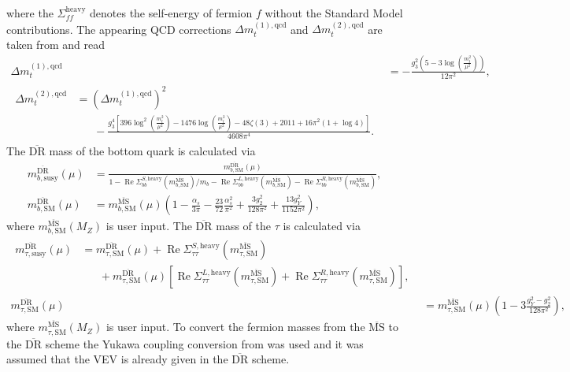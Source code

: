 \documentclass[final,3p,times,pdflatex]{elsarticle}
\newcommand{\textoverline}[1]{$\overline{\mbox{#1}}$}
\newcommand{\DRbar}{\textoverline{DR}\xspace}
\newcommand{\MSbar}{\textoverline{MS}\xspace}
\DeclareMathOperator{\re}{Re}
\begin{document}
%
where the $\Sigma_{ff}^\text{heavy}$ denotes the self-energy of
fermion $f$ without the Standard Model contributions.  The appearing
QCD corrections $\Delta m_t^{(1),\text{qcd}}$ and $\Delta
m_t^{(2),\text{qcd}}$ are taken from
\cite[Eq.\ (58),(61)]{Bednyakov:2002sf} and read
%
\begin{align}
  \Delta m_t^{(1),\text{qcd}} &= -\frac{g_3^2 \left(5-3 \log\left(\frac{m_t^2}{\mu^2}\right)\right)}{12 \pi^2},\\
  \begin{split}
    \Delta m_t^{(2),\text{qcd}} &= \left(\Delta
      m_t^{(1),\text{qcd}}\right)^2 \\
    &\phantom{=\;} - \frac{g_3^4 \left[396
        \log^2\left(\frac{m_t^2}{\mu^2}\right)-1476
        \log\left(\frac{m_t^2}{\mu^2}\right)-48 \zeta(3)+2011+16 \pi
        ^2 (1+\log 4)\right]}{4608 \pi^4}.
  \end{split}
\end{align}
%
The \DRbar mass of the bottom quark is calculated via
\cite{Baer:2002ek,Skands:2003cj}
%
\begin{align}
  m_{b,\text{susy}}^{\text{\DRbar}}(\mu) &=
  \frac{m_{b,\text{SM}}^{\text{\DRbar}}(\mu)}{1 -
    \re\Sigma_{bb}^{S,\text{heavy}}(m_{b,\text{SM}}^\text{\MSbar})/m_b
    - \re\Sigma_{bb}^{L,\text{heavy}}(m_{b,\text{SM}}^\text{\MSbar}) -
    \re\Sigma_{bb}^{R,\text{heavy}}(m_{b,\text{SM}}^\text{\MSbar})} ,\\
  m_{b,\text{SM}}^{\text{\DRbar}}(\mu) &=
  m_{b,\text{SM}}^{\text{\MSbar}}(\mu) \left(1 - \frac{\alpha_s}{3
      \pi} - \frac{23}{72} \frac{\alpha_s^2}{\pi^2} + \frac{3
      g_2^2}{128 \pi^2} + \frac{13 g_Y^2}{1152 \pi^2}\right) ,
\end{align}
%
where $m_{b,\text{SM}}^{\text{\MSbar}}(M_Z)$ is user input.  The
\DRbar mass of the $\tau$ is calculated via
%
\begin{align}
  \begin{split}
    m_{\tau,\text{susy}}^{\text{\DRbar}}(\mu) &=
    m_{\tau,\text{SM}}^{\text{\DRbar}}(\mu) +
    \re\Sigma_{\tau\tau}^{S,\text{heavy}}(m_{\tau,\text{SM}}^\text{\MSbar}) \\
    &\phantom{=\;} + m_{\tau,\text{SM}}^{\text{\DRbar}}(\mu) \left[
      \re\Sigma_{\tau\tau}^{L,\text{heavy}}(m_{\tau,\text{SM}}^\text{\MSbar})
      +
      \re\Sigma_{\tau\tau}^{R,\text{heavy}}(m_{\tau,\text{SM}}^\text{\MSbar})
    \right] ,
  \end{split}\\
  m_{\tau,\text{SM}}^{\text{\DRbar}}(\mu) &= m_{\tau,\text{SM}}^{\text{\MSbar}}(\mu)
  \left(1 - 3 \frac{g_Y^2 - g_2^2}{128 \pi^2}\right),
\end{align}
%
where $m_{\tau,\text{SM}}^{\text{\MSbar}}(M_Z)$ is user input.  To
convert the fermion masses from the \MSbar to the \DRbar scheme the
Yukawa coupling conversion from \cite[Eq.~(19)]{Skands:2003cj} was
used and it was assumed that the VEV is already given in the \DRbar
scheme.
\end{document}
